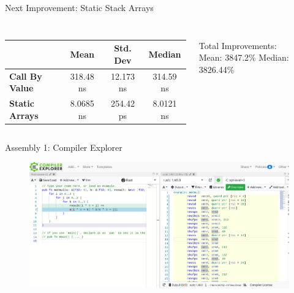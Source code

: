 \documentclass[compress,aspectratio=169]{beamer}
\begin{document}
\begin{frame}[fragile]{Next Improvement: Static Stack Arrays}
  \begin{tcolorbox}[title=Static Stack Arrays]
    \footnotesize\inputminted[xleftmargin=1em,linenos]{rust}{./assets/less_heap_allocation.rs}
  \end{tcolorbox}
  \begin{columns}
    \begin{column}{0.7\textwidth}
  \begin{table}[h]
    \centering
    \begin{tabular}{|l|c|c|c|}
      \hline
      &\textbf{Mean} & \textbf{Std. Dev} & \textbf{Median}\\
      \hline
      \textbf{Call By Value} & 318.48 ns & 12.173 ns & 314.59 ns \\
      \hline
      \textbf{Static Arrays} & 8.0685 ns & 254.42 ps & 8.0121 ns\\
      \hline
      \end{tabular}
  \end{table}
    \end{column}
    \begin{column}{0.3\textwidth}
      Total Improvements:\\
      Mean: 3847.2\%
      Median: 3826.44\%\\
    \end{column}
  \end{columns}
\end{frame}

\begin{frame}{Assembly 1: Compiler Explorer \cite{godbolt}}
  \begin{figure}[h]
    \includegraphics[width=\textwidth]{./assets/compilerexplorer.png}
  \end{figure}
\end{frame}
\end{document}
